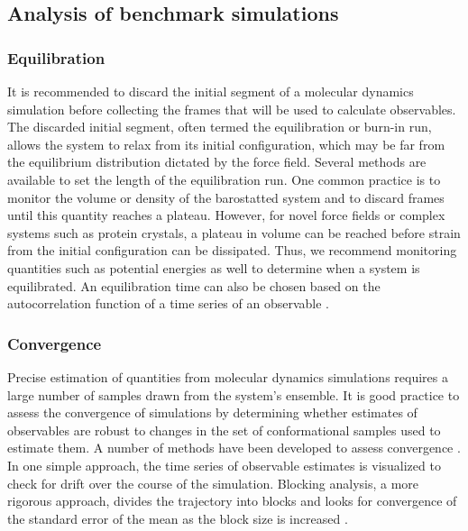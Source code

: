 \documentclass[9pt,review,pubversion]{livecoms}
\begin{document}
\subsection{Analysis of benchmark simulations}
\label{sub:best_practices_analysis}

\subsubsection{Equilibration}
\label{sub2:equilibration}

It is recommended to discard the initial segment of a molecular dynamics simulation before collecting the frames that will be used to calculate observables.
The discarded initial segment, often termed the equilibration or burn-in run, allows the system to relax from its initial configuration, which may be far from the equilibrium distribution dictated by the force field.
Several methods are available to set the length of the equilibration run.
One common practice is to monitor the volume or density of the barostatted system and to discard frames until this quantity reaches a plateau.
However, for novel force fields or complex systems such as protein crystals, a plateau in volume can be reached before strain from the initial configuration can be dissipated.
Thus, we recommend monitoring quantities such as potential energies as well to determine when a system is equilibrated.
An equilibration time can also be chosen based on the autocorrelation function of a time series of an observable \cite{chodera_simple_2016}.

\subsubsection{Convergence}
\label{sub2:convergence}

Precise estimation of quantities from molecular dynamics simulations requires a large number of samples drawn from the system's ensemble.
It is good practice to assess the convergence of simulations by determining whether estimates of observables are robust to changes in the set of conformational samples used to estimate them.
A number of methods have been developed to assess convergence \cite{grossfield_best_2019}.
In one simple approach, the time series of observable estimates is visualized to check for drift over the course of the simulation.
Blocking analysis, a more rigorous approach, divides the trajectory into blocks and looks for convergence of the standard error of the mean as the block size is increased \cite{flyvbjerg_error_1989}.
\end{document}
